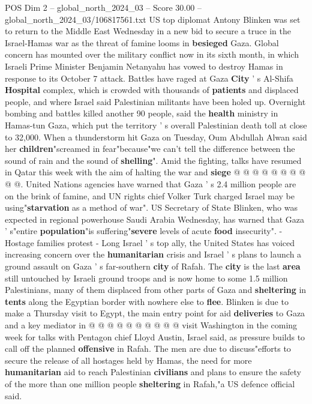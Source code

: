 \begin{textsample}{POS Dim 2 – global\_north\_2024\_03 – Score 30.00 – global\_north\_2024\_03/106817561.txt}  \label{ex:f2_pos_110}
US top diplomat Antony Blinken was set to return to the Middle East Wednesday in a new bid to secure a truce in the Israel-Hamas war as the threat of famine looms in \textbf{besieged} Gaza.
Global concern has mounted over the military conflict now in its sixth month, in which Israeli Prime Minister Benjamin Netanyahu has vowed to destroy Hamas in response to its October 7 attack.
Battles have raged at Gaza \textbf{City} ' s Al-Shifa \textbf{Hospital} complex, which is crowded with thousands of \textbf{patients} and displaced people, and where Israel said Palestinian militants have been holed up.
Overnight bombing and battles killed another 90 people, said the \textbf{health} ministry in Hamas-tun Gaza, which put the territory ' s overall Palestinian death toll at close to 32,000.
When a thunderstorm hit Gaza on Tuesday, Oum Abdullah Alwan said her \textbf{children}"screamed in fear"because"we can't tell the difference between the sound of rain and the sound of \textbf{shelling}".
Amid the fighting, talks have resumed in Qatar this week with the aim of halting the war and \textbf{siege} @ @ @ @ @ @ @ @ @ @.
United Nations agencies have warned that Gaza ' s 2.4 million people are on the brink of famine, and UN rights chief Volker Turk charged Israel may be using"\textbf{starvation} as a method of war".
US Secretary of State Blinken, who was expected in regional powerhouse Saudi Arabia Wednesday, has warned that Gaza ' s"entire \textbf{population}"is suffering"\textbf{severe} levels of acute \textbf{food} insecurity". - Hostage families protest - Long Israel ' s top ally, the United States has voiced increasing concern over the \textbf{humanitarian} crisis and Israel ' s plans to launch a ground assault on Gaza ' s far-southern \textbf{city} of Rafah.
The \textbf{city} is the last \textbf{area} still untouched by Israeli ground troops and is now home to some 1.5 million Palestinians, many of them displaced from other parts of Gaza and \textbf{sheltering} in \textbf{tents} along the Egyptian border with nowhere else to \textbf{flee}.
Blinken is due to make a Thursday visit to Egypt, the main entry point for aid \textbf{deliveries} to Gaza and a key mediator in @ @ @ @ @ @ @ @ @ @ visit Washington in the coming week for talks with Pentagon chief Lloyd Austin, Israel said, as pressure builds to call off the planned \textbf{offensive} in Rafah.
The men are due to discuss"efforts to secure the release of all hostages held by Hamas, the need for more \textbf{humanitarian} aid to reach Palestinian \textbf{civilians} and plans to ensure the safety of the more than one million people \textbf{sheltering} in Rafah,"a US defence official said.

\end{textsample}
